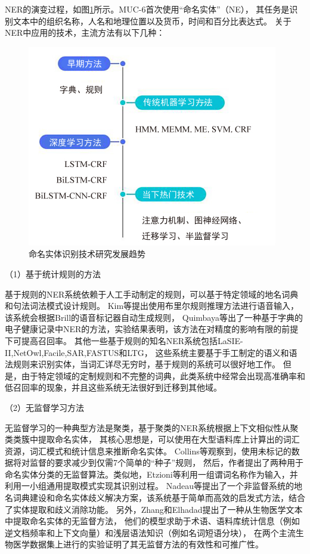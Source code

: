 NER的演变过程，如图\ref{fig:nerp}所示。MUC-6首次使用“命名实体”（NE），
其任务是识别文本中的组织名称，人名和地理位置以及货币，时间和百分比表达式。
关于NER中应用的技术，主流方法有以下几种：

\begin{figure}[htbp]
  \centering
  \includegraphics[scale=1]{./images/nerp.jpg}
  \caption{命名实体识别技术研究发展趋势\cite{nadeau2007survey}}
  \label{fig:nerp}
\end{figure}

（1）基于统计规则的方法

基于规则的NER系统依赖于人工手动制定的规则，可以基于特定领域的地名词典和句法词法模式设计规则。
Kim等提出使用布里尔规则推理方法进行语音输入，该系统会根据Brill的语音标记器自动生成规则\cite{kim2000rule}，
Quimbaya等出了一种基于字典的电子健康记录中NER的方法\cite{pomares2016named}，实验结果表明，该方法在对精度的影响有限的前提下可提高召回率。
其他一些基于规则的知名NER系统包括LaSIE-II,NetOwl,Facile,SAR,FASTUS和LTG，
这些系统主要基于手工制定的语义和语法规则来识别实体，当词汇详尽无穷时，基于规则的系统可以很好地工作。
但是，由于特定领域的定制规则和不完整的词典，此类系统中经常会出现高准确率和低召回率的现象，并且这些系统无法很好到迁移到其他域。

（2）无监督学习方法

无监督学习的一种典型方法是聚类，基于聚类的NER系统根据上下文相似性从聚类类簇中提取命名实体，
其核心思想是，可以使用在大型语料库上计算出的词汇资源，词汇模式和统计信息来推断命名实体。 
Collins等观察到，使用未标记的数据将对监督的要求减少到仅需7个简单的“种子”规则\cite{collins1999unsupervised}，
然后，作者提出了两种用于命名实体分类的无监督算法。类似地，Etzioni等利用一组谓词名称作为输入，并利用一小组通用提取模式实现其识别过程\cite{etzioni2005unsupervised}。 
Nadeau等提出了一个非监督系统的地名词典建设和命名实体歧义解决方案，该系统基于简单而高效的启发式方法，结合了实体提取和歧义消除功能\cite{nadeau2006unsupervised}。
另外，Zhang和Elhadad提出了一种从生物医学文本中提取命名实体的无监督方法\cite{zhang2013unsupervised}，
他们的模型求助于术语、语料库统计信息（例如逆文档频率和上下文向量）和浅层语法知识（例如名词短语分块），
在两个主流生物医学数据集上进行的实验证明了其无监督方法的有效性和可推广性。

